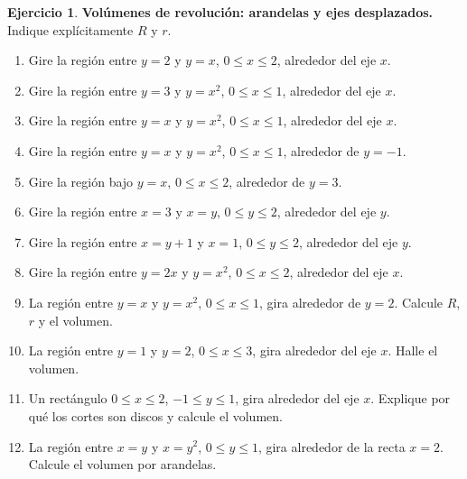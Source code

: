 \documentclass[12pt]{article}
\theoremstyle{definition}
\newtheorem{Ejer}[teorema]{Ejercicio}
\theoremstyle{remark}
\begin{document}
\begin{Ejer}\textbf{Volúmenes de revolución: arandelas y ejes desplazados.} Indique explícitamente $R$ y $r$.
\begin{enumerate}[resume=banco3]
\item Gire la región entre $y=2$ y $y=x$, $0\le x\le2$, alrededor del eje $x$.
\item Gire la región entre $y=3$ y $y=x^2$, $0\le x\le1$, alrededor del eje $x$.
\item Gire la región entre $y=x$ y $y=x^2$, $0\le x\le1$, alrededor del eje $x$.
\item Gire la región entre $y=x$ y $y=x^2$, $0\le x\le1$, alrededor de $y=-1$.
\item Gire la región bajo $y=x$, $0\le x\le2$, alrededor de $y=3$.
\item Gire la región entre $x=3$ y $x=y$, $0\le y\le2$, alrededor del eje $y$.
\item Gire la región entre $x=y+1$ y $x=1$, $0\le y\le2$, alrededor del eje $y$.
\item Gire la región entre $y=2x$ y $y=x^2$, $0\le x\le2$, alrededor del eje $x$.
\item La región entre $y=x$ y $y=x^2$, $0\le x\le1$, gira alrededor de $y=2$. Calcule $R$, $r$ y el volumen.
\item La región entre $y=1$ y $y=2$, $0\le x\le3$, gira alrededor del eje $x$. Halle el volumen.
\item Un rectángulo $0\le x\le2$, $-1\le y\le1$, gira alrededor del eje $x$. Explique por qué los cortes son discos y calcule el volumen.
\item La región entre $x=y$ y $x=y^2$, $0\le y\le1$, gira alrededor de la recta $x=2$. Calcule el volumen por arandelas.
\end{enumerate}
\end{Ejer}
\end{document}
